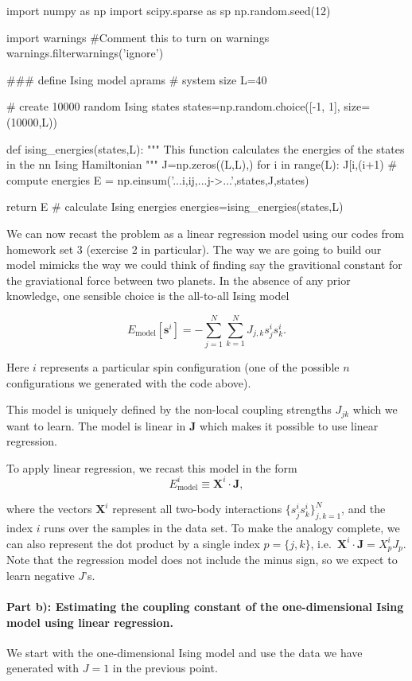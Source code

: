 \documentclass[%
oneside,                 %
final,                   %
10pt]{article}
\begin{document}
\bpycod
import numpy as np
import scipy.sparse as sp
np.random.seed(12)

import warnings
#Comment this to turn on warnings
warnings.filterwarnings('ignore')

### define Ising model aprams
# system size
L=40

# create 10000 random Ising states
states=np.random.choice([-1, 1], size=(10000,L))

def ising_energies(states,L):
    """
    This function calculates the energies of the states in the nn Ising Hamiltonian
    """
    J=np.zeros((L,L),)
    for i in range(L):
        J[i,(i+1)%
    # compute energies
    E = np.einsum('...i,ij,...j->...',states,J,states)

    return E
# calculate Ising energies
energies=ising_energies(states,L)

\epycod


We can now recast the problem as a linear regression model using our codes from homework set 3 (exercise 2 in particular).
The way we are going to build our model mimicks the way we could think of finding say the gravitional constant for the graviational force between two planets.
In the absence of any prior knowledge, one sensible choice is the all-to-all Ising model

\[
E_\mathrm{model}[\boldsymbol{s}^i] = - \sum_{j=1}^N \sum_{k=1}^N J_{j,k}s_{j}^is_{k}^i.
\]

Here $i$ represents a particular spin configuration (one of the possible $n$ configurations we generated with the code above).

This model is uniquely defined by the non-local coupling strengths $J_{jk}$ which we want to learn.
The model is linear in $\mathbf{J}$ which makes it possible to use linear regression.

To apply linear regression, we recast this model in the form
\[
E_\mathrm{model}^i \equiv \mathbf{X}^i \cdot \mathbf{J},
\]

where the vectors $\mathbf{X}^i$ represent all two-body interactions
$\{s_{j}^is_{k}^i \}_{j,k=1}^N$, and the index $i$ runs over the
samples in the data set.  To make the analogy complete, we can also
represent the dot product by a single index $p = \{j,k\}$,
i.e.~$\mathbf{X}^i \cdot \mathbf{J}=X^i_pJ_p$.  Note that the
regression model does not include the minus sign, so we expect to
learn negative $J$'s.

\paragraph{Part b): Estimating the coupling constant of the one-dimensional Ising model using linear regression.}
We start with the one-dimensional Ising model and use the data we have
generated with $J=1$ in the previous point.
\end{document}
